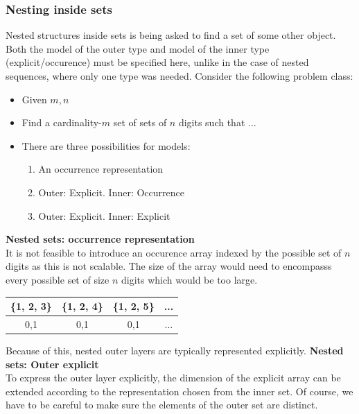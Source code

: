\documentclass[CS4402-Notes.tex]{subfiles}
\begin{document}
\subsubsection{Nesting inside sets}
Nested structures inside sets is being asked to find a set of some other object. Both the model of the outer type and model of the inner type (explicit/occurence) must be specified here, unlike in the case of nested sequences, where only one type was needed.
\n
Consider the following problem class:
\begin{itemize}
\item Given $m, n$
\item Find a cardinality-$m$ set of sets of $n$ digits such that ...
\item There are three possibilities for models:
  \begin{enumerate}
  \item An occurrence representation
  \item Outer: Explicit. Inner: Occurrence
  \item Outer: Explicit. Inner: Explicit
  \end{enumerate}
\end{itemize}
\textbf{Nested sets: occurrence representation} \\
It is not feasible to introduce an occurence array indexed by the possible set of $n$ digits as this is not scalable. The size of the array would need to encompasss every possible set of size $n$ digits which would be too large.
\begin{table}[H]
\centering
\begin{tabular}{| c | c | c | c |}
\hline
\textbf{\{1, 2, 3\}} & \textbf{\{1, 2, 4\}} & \textbf{\{1, 2, 5\}} & ... \\
\hline
0,1 & 0,1 & 0,1 & ... \\ 
\hline
\end{tabular}
\end{table}
Because of this, nested outer layers are typically represented explicitly.
\n
\textbf{Nested sets: Outer explicit} \\
To express the outer layer explicitly, the dimension of the explicit array can be extended according to the representation chosen from the inner set. Of course, we have to be careful to make sure the elements of the outer set are distinct.
\end{document}
